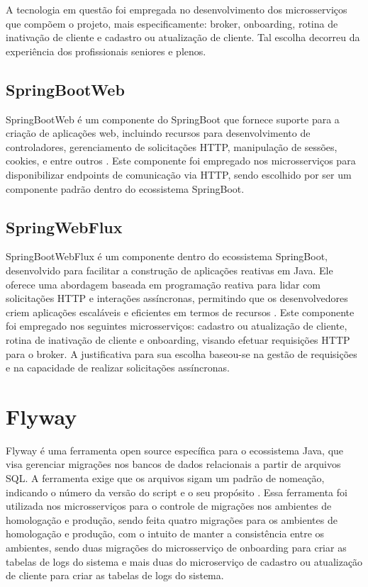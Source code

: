 A tecnologia em questão foi empregada no desenvolvimento dos microsserviços que compõem o projeto, mais especificamente: 
broker, onboarding, rotina de inativação de cliente e cadastro ou atualização de cliente. Tal escolha decorreu da 
experiência dos profissionais seniores e plenos.

\subsection{SpringBootWeb}

SpringBootWeb é um componente do SpringBoot que fornece suporte para a criação de aplicações web, incluindo 
recursos para desenvolvimento de controladores, gerenciamento de solicitações HTTP, manipulação de sessões, cookies, 
e entre outros \cite{spring:web:explicacao}. Este componente foi empregado nos microsserviços para disponibilizar 
endpoints de comunicação via HTTP, sendo escolhido por ser um componente padrão dentro do ecossistema SpringBoot.

\subsection{SpringWebFlux}

SpringBootWebFlux é um componente dentro do ecossistema SpringBoot, desenvolvido para facilitar a construção de aplicações
reativas em Java. Ele oferece uma abordagem baseada em programação reativa para lidar com solicitações HTTP e interações 
assíncronas, permitindo que os desenvolvedores criem aplicações escaláveis e eficientes em termos de recursos \cite{spring:web:flux:explicacao}. 
Este componente foi empregado nos seguintes microsserviços: cadastro ou atualização de cliente, rotina de inativação 
de cliente e onboarding, visando efetuar requisições HTTP para o broker. A justificativa para sua escolha baseou-se na 
gestão de requisições e na capacidade de realizar solicitações assíncronas.

\section{Flyway}

Flyway é uma ferramenta open source específica para o ecossistema Java, que visa gerenciar migrações nos bancos de dados 
relacionais a partir de arquivos SQL. A ferramenta exige que os arquivos sigam um padrão de nomeação, indicando o número 
da versão do script e o seu propósito \cite{flyway:explicacao}. 
Essa ferramenta foi utilizada nos microsserviços para o controle de migrações nos 
ambientes de homologação e produção, sendo feita quatro migrações para os ambientes 
de homologação e produção, com o intuito de manter a consistência entre os ambientes,
sendo duas migrações do microsserviço de onboarding para criar as tabelas de logs do sistema
e mais duas do microserviço de cadastro ou atualização de cliente para criar as tabelas de logs do sistema.


